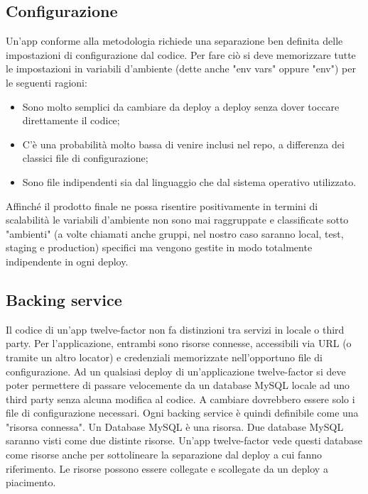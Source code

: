 \documentclass[PianoDiQualifica.tex]{subfiles}
\begin{document}
\subsection{Configurazione}
Un'app conforme alla metodologia richiede una separazione ben definita delle impostazioni di configurazione dal codice.
Per fare ciò si deve memorizzare tutte le impostazioni in variabili d'ambiente (dette anche "env vars" oppure "env") per le seguenti ragioni:
\begin{itemize}
\item Sono molto semplici da cambiare da deploy a deploy senza dover toccare direttamente il codice;
\item C'è una probabilità molto bassa di venire inclusi nel repo, a differenza dei classici file di configurazione;
\item Sono file indipendenti sia dal linguaggio che dal sistema operativo utilizzato.
\end{itemize}
Affinché il prodotto finale ne possa risentire positivamente in termini di scalabilità le variabili d'ambiente non sono mai raggruppate e classificate sotto "ambienti" (a volte chiamati anche gruppi, nel nostro caso saranno local, test, staging e production) specifici ma vengono gestite in modo totalmente indipendente in ogni deploy.

\subsection{Backing service}
Il codice di un'app twelve-factor non fa distinzioni tra servizi in locale o third party. Per l'applicazione, entrambi sono risorse connesse, accessibili via URL (o tramite un altro locator) e credenziali memorizzate nell'opportuno file di configurazione. Ad un qualsiasi deploy di un'applicazione twelve-factor si deve poter permettere di passare velocemente da un database MySQL locale ad uno third party senza alcuna modifica al codice. A cambiare dovrebbero essere solo i file di configurazione necessari.
Ogni backing service è quindi definibile come una "risorsa connessa". Un Database MySQL è una risorsa. Due database MySQL saranno visti come due distinte risorse. Un'app twelve-factor vede questi database come risorse anche per sottolineare la separazione dal deploy a cui fanno riferimento. Le risorse possono essere collegate e scollegate da un deploy a piacimento.
\end{document}
